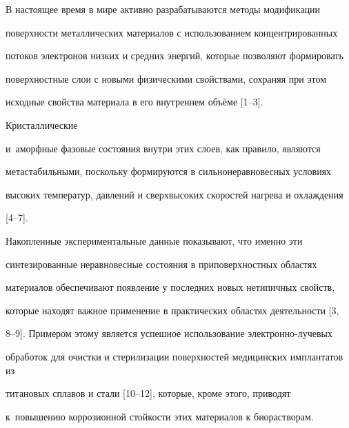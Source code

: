 


\date{23/VII/2009}






\maketitle







В настоящее время в мире активно разрабатываются методы модификации

поверхности металлических материалов с использованием концентрированных

потоков электронов низких и средних энергий, которые позволяют формировать

поверхностные слои с новыми физическими свойствами, сохраняя при этом

исходные свойства материала в его внутреннем объёме [1--3].

Кристаллические

и~аморфные фазовые состояния внутри этих слоев, как правило, являются

метастабильными, поскольку формируются в сильнонеравновесных условиях

высоких температур, давлений и сверхвысоких скоростей нагрева и охлаждения

[4--7].

Накопленные экспериментальные данные показывают, что именно эти

синтезированные неравновесные состояния в приповерхностных областях

материалов обеспечивают появление у последних новых нетипичных свойств,

которые находят важное применение в практических областях деятельности [3,

8--9]. Примером этому является успешное использование электронно-лучевых

обработок для очистки и стерилизации поверхностей медицинских имплантатов из

титановых сплавов и стали \mbox{[10--12]}, которые, кроме этого, приводят

к~повышению коррозионной стойкости этих материалов к биорастворам.

